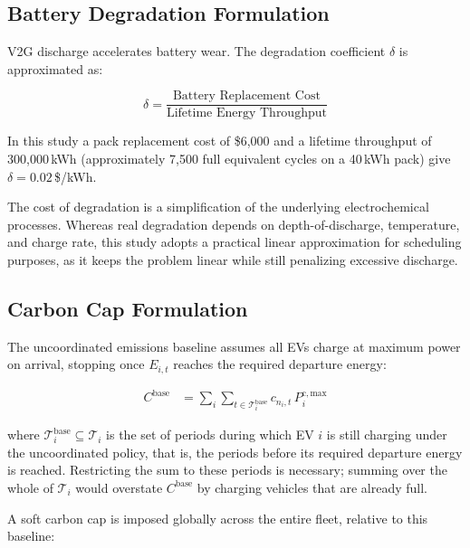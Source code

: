 \documentclass[sustainability,article,submit,moreauthors,pdftex]{Definitions/mdpi}
\begin{document}
\subsection{Battery Degradation Formulation}

V2G discharge accelerates battery wear. The degradation coefficient $\delta$ is approximated as:

\begin{equation}
\delta
=
\frac{\text{Battery Replacement Cost}}{\text{Lifetime Energy Throughput}}
\label{eq:deg_coeff}
\end{equation}

In this study a pack replacement cost of \$6{,}000 and a lifetime throughput of 300{,}000\,kWh (approximately 7{,}500 full equivalent cycles on a 40\,kWh pack) give $\delta = 0.02$\,\$/kWh.

The cost of degradation is a simplification of the underlying electrochemical processes. Whereas real degradation depends on depth-of-discharge, temperature, and charge rate, this study adopts a practical linear approximation for scheduling purposes, as it keeps the problem linear while still penalizing excessive discharge.

\subsection{Carbon Cap Formulation}

The uncoordinated emissions baseline assumes all EVs charge at maximum power on arrival, stopping once $E_{i,t}$ reaches the required departure energy:

\begin{equation}
\begin{aligned}
C^{\mathrm{base}}
&=
\sum_i \sum_{t \in \mathcal{T}^{\mathrm{base}}_i}
c_{n_i,t}\, P_i^{\mathrm{c,max}}
\end{aligned}
\label{eq:baseline}
\end{equation}

where $\mathcal{T}^{\mathrm{base}}_i \subseteq \mathcal{T}_i$ is the set of periods during which EV $i$ is still charging under the uncoordinated policy, that is, the periods before its required departure energy is reached. Restricting the sum to these periods is necessary; summing over the whole of $\mathcal{T}_i$ would overstate $C^{\mathrm{base}}$ by charging vehicles that are already full.

A soft carbon cap is imposed globally across the entire fleet, relative to this baseline:
\end{document}
